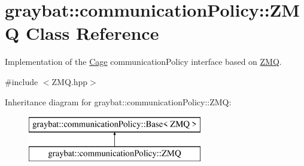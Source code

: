 \hypertarget{structgraybat_1_1communicationPolicy_1_1ZMQ}{}\section{graybat\+:\+:communication\+Policy\+:\+:Z\+M\+Q Class Reference}
\label{structgraybat_1_1communicationPolicy_1_1ZMQ}


Implementation of the \hyperlink{structgraybat_1_1Cage}{Cage} communication\+Policy interface based on \hyperlink{structgraybat_1_1communicationPolicy_1_1ZMQ}{Z\+M\+Q}.  




{\ttfamily \#include $<$Z\+M\+Q.\+hpp$>$}

Inheritance diagram for graybat\+:\+:communication\+Policy\+:\+:Z\+M\+Q\+:\begin{figure}[H]
\begin{center}
\leavevmode
\includegraphics[height=2.000000cm]{structgraybat_1_1communicationPolicy_1_1ZMQ}
\end{center}
\end{figure}
